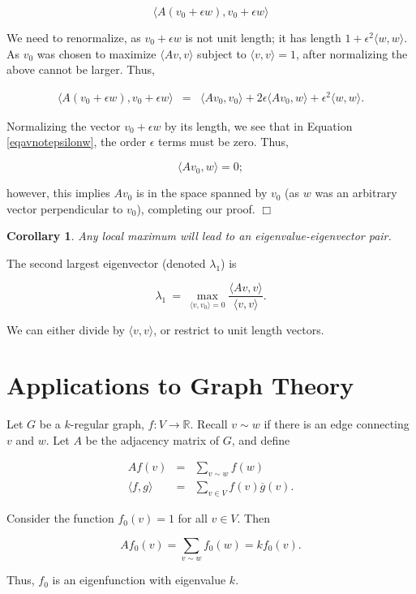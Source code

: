 \documentclass[12pt,letterpaper]{report}
\newcommand\be{\begin{equation}}
\newcommand\ee{\end{equation}}
\newcommand\bea{\begin{eqnarray}}
\newcommand\eea{\end{eqnarray}}
\newcommand{\R}{\ensuremath{\mathbb{R}}}
\newtheorem{cor}[thm]{Corollary}
\begin{document}
\be \langle A(v_0 + \epsilon w), v_0 + \epsilon w \rangle \ee

We need to renormalize, as $v_0 + \epsilon w$ is not unit length;
it has length $1 + \epsilon^2 \langle w,w\rangle$. As $v_0$ was
chosen to maximize $\langle Av, v\rangle$ subject to $\langle v,v
\rangle = 1$, after normalizing the above cannot be larger. Thus,

\bea\label{eqavnotepsilonw} \langle A(v_0 + \epsilon w), v_0 +
\epsilon w \rangle &=& \langle Av_0, v_0 \rangle + 2\epsilon
\langle Av_0,w \rangle + \epsilon^2 \langle w,w\rangle. \eea

Normalizing the vector $v_0 + \epsilon w$ by its length, we see
that in Equation \ref{eqavnotepsilonw}, the order $\epsilon$ terms
must be zero. Thus,

\be \langle Av_0, w \rangle = 0; \ee

however, this implies $Av_0$ is in the space spanned by $v_0$ (as
$w$ was an arbitrary vector perpendicular to $v_0$), completing
our proof. $\Box$

\begin{cor} Any local maximum will lead to an
eigenvalue-eigenvector pair. \end{cor}

The second largest eigenvector (denoted $\lambda_1$) is

\be \lambda_1 \ = \ \max_{ \langle v, v_0 \rangle = 0} \frac{
\langle Av,v \rangle }{\langle v, v\rangle }. \ee

We can either divide by $\langle v, v\rangle$, or restrict to unit
length vectors.


\section{Applications to Graph Theory}

Let $G$ be a $k$-regular graph, $f: V \rightarrow \R$. Recall $v
\sim w$ if there is an edge connecting $v$ and $w$. Let $A$ be the
adjacency matrix of $G$, and define

\bea Af(v) &=& \sum_{v \sim w} f(w) \nonumber\\ \langle f,g
\rangle &=& \sum_{v \in V} f(v) \overline{g}(v). \eea

Consider the function $f_0(v) = 1$ for all $v \in V$. Then

\be Af_0(v) = \sum_{v \sim w} f_0(w) = kf_0(v). \ee

Thus, $f_0$ is an eigenfunction with eigenvalue $k$.
\end{document}
